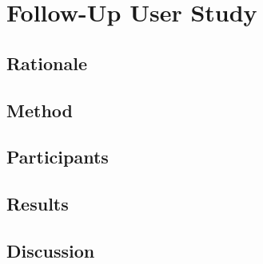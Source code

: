 
\chapter{Follow-Up User Study}

\section{Rationale}

\section{Method}

\section{Participants}

\section{Results}

\section{Discussion}

